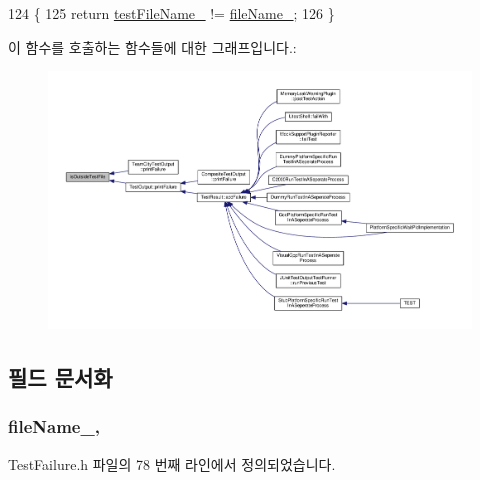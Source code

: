 \begin{DoxyCode}
124 \{
125     \textcolor{keywordflow}{return} \hyperlink{class_test_failure_a19c231b59846532ec9d7ac8725886d67}{testFileName\_} != \hyperlink{class_test_failure_a58b6159b0aa3b9775be67920baef742c}{fileName\_};
126 \}
\end{DoxyCode}


이 함수를 호출하는 함수들에 대한 그래프입니다.\+:
\nopagebreak
\begin{figure}[H]
\begin{center}
\leavevmode
\includegraphics[width=350pt]{class_test_failure_a977b24b749f7dc0d279fed902991c7b4_icgraph}
\end{center}
\end{figure}




\subsection{필드 문서화}
\subsubsection[{\texorpdfstring{file\+Name\+\_\+}{fileName_}}]{ file\+Name\+\_\+\hspace{0.3cm}{\ttfamily [protected]}, {\ttfamily [inherited]}}\hypertarget{class_test_failure_a58b6159b0aa3b9775be67920baef742c}{}\label{class_test_failure_a58b6159b0aa3b9775be67920baef742c}


Test\+Failure.\+h 파일의 78 번째 라인에서 정의되었습니다.

